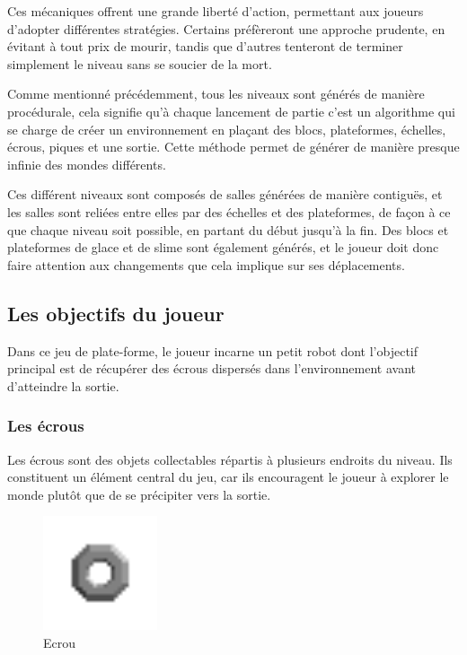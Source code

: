\documentclass[10pt]{report}
\begin{document}
Ces mécaniques offrent une grande liberté d'action, permettant aux joueurs d’adopter différentes stratégies.
Certains préfèreront une approche prudente, en évitant à tout prix de mourir, tandis que d’autres tenteront de terminer simplement le niveau sans se soucier de la mort.


Comme mentionné précédemment, tous les niveaux sont générés de manière procédurale, cela signifie qu'à chaque
lancement de partie c'est un algorithme qui se charge de créer un environnement en plaçant des blocs, plateformes,
échelles, écrous, piques et une sortie.
Cette méthode permet de générer de manière presque infinie des mondes différents.

Ces différent niveaux sont composés de salles générées de manière 
contiguës, et les salles sont reliées entre elles par des échelles et des
plateformes, de façon à ce que chaque niveau soit possible, en partant du
début jusqu'à la fin.
Des blocs et plateformes de glace et de slime sont
également générés, et le joueur doit donc faire attention aux changements 
que cela implique sur ses déplacements.


\subsection{Les objectifs du joueur}

Dans ce jeu de plate-forme, le joueur incarne un petit robot dont l’objectif principal est de récupérer des écrous
dispersés dans l’environnement avant d’atteindre la sortie.


\subsubsection{Les écrous}

Les écrous sont des objets collectables répartis à plusieurs endroits du niveau.
Ils constituent un élément central du jeu, car ils encouragent le joueur à explorer le monde plutôt que de se
précipiter vers la sortie.

\begin{figure}[H]
  \centering
  \includegraphics[width=0.3\textwidth]{images/nut}
  \caption{Ecrou}
\end{figure}
\end{document}
